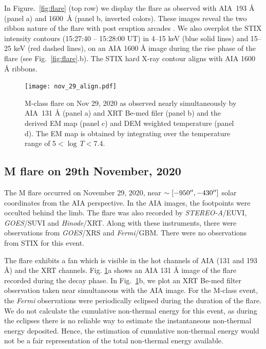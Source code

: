 In Figure.~\ref{fig:flare} (top row) we display the flare as observed with AIA~193 {\AA} (panel a) and 1600~{\AA} (panel b, inverted colors). These images reveal the two ribbon nature of the flare with post eruption arcades \cite[see e.g.][]{TriBC_2004}. We also overplot the STIX intensity contours (15:27:40 {--} 15:28:00 UT) in 4{--}15 keV (blue solid lines) and 15{--}25 keV (red dashed lines), on an AIA 1600 {\AA} image during the rise phase of the flare (see Fig.~\ref{fig:flare}.b). The STIX hard X-ray contour aligns with AIA 1600 {\AA} ribbons.


\begin{figure}[ht!]
\centering
    \texttt{[image: nov\_29\_align.pdf]}
    \caption[Observation of the M-class flare on November 29, 2020.]{M-class flare on Nov 29, 2020 as observed nearly simultaneously by AIA~{131 \AA} (panel a) and XRT Be-med filer (panel b) and the derived EM map (panel c) and DEM weighted temperature (panel d). The EM map is obtained by integrating over the temperature range of 5$<\log\,T<$7.4.}
    \label{fig:flare2}
\end{figure}

\subsection{M flare on 29th November, 2020}\label{sec:m-obs}

The M flare occurred on November 29, 2020, near $\sim [-950\hbox{$^{\prime\prime}$},-430\hbox{$^{\prime\prime}$}]$ solar coordinates from the AIA perspective. In the AIA images, the footpoints were occulted behind the limb. The flare was also recorded by {\it STEREO-A}/EUVI, {\it GOES}/SUVI and {\it Hinode}/XRT. Along with these instruments, there were observations from {\it GOES}/XRS and {\it Fermi}/GBM. There were no observations from STIX for this event.

The flare exhibits a fan which is visible in the hot channels of AIA (131 and 193 {\AA}) and the XRT channels. Fig. \ref{fig:flare2}a shows an AIA 131 {\AA} image of the flare recorded during the decay phase. In Fig.~\ref{fig:flare2}b, we plot an XRT Be-med filter observation taken near simultaneous with the AIA image. For the M-class event, the {\it Fermi} observations were periodically eclipsed during the duration of the flare. We do not calculate the cumulative non-thermal energy for this event, as during the eclipses there is no reliable way to estimate the instantaneous non-thermal energy deposited. Hence, the estimation of cumulative non-thermal energy would not be a fair representation of the total non-thermal energy available.

